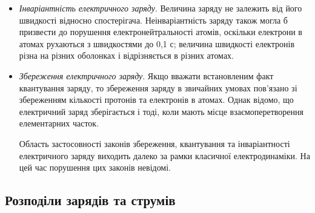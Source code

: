 \begin{itemize}
	\item \textit{Інваріантність електричного заряду}. Величина заряду не залежить від його швидкості відносно спостерігача. Неінваріантність заряду також могла б призвести до порушення електронейтральності атомів, оскільки електрони в атомах рухаються з швидкостями до 0,1 с; величина швидкості електронів різна на різних оболонках і відрізняється в різних атомах.



	\item \textit{Збереження електричного заряду}. Якщо вважати встановленим факт
	      квантування заряду, то збереження заряду в звичайних умовах пов’язано зі
	      збереженням кількості протонів та електронів в атомах. Однак відомо, що
	      електричний заряд зберігається і тоді, коли мають місце взаємоперетворення
	      елементарних часток.


	      Область застосовності законів збереження, квантування та інваріантності
	      електричного заряду виходить далеко за рамки класичної електродинаміки. На
	      цей час порушення цих законів невідомі.

\end{itemize}

\subsection*{Розподіли зарядів та струмів}

